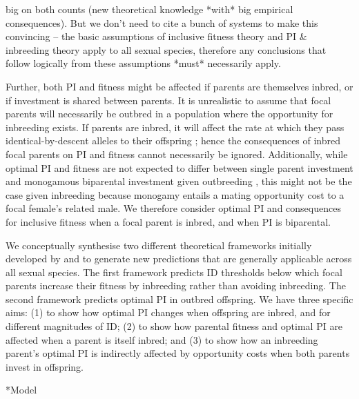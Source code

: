 \documentclass[12pt]{article}
\makeatletter
\renewcommand\section{\@startsection{section}{1}{0in}{-0.5\baselineskip}{0.1\baselineskip}{\normalfont\large\bfseries}}
\makeatother
\begin{document}
big on both counts (new theoretical knowledge *with* big empirical consequences). But we don't need to cite a bunch of systems to make this convincing -- the basic assumptions of inclusive fitness theory and PI & inbreeding theory apply to all sexual species, therefore any conclusions that follow logically from these assumptions *must* necessarily apply. 

Further, both PI and fitness might be affected if parents are themselves inbred, or if investment is shared between parents. It is unrealistic to assume that focal parents will necessarily be outbred in a population where the opportunity for inbreeding exists. If parents are inbred, it will affect the rate at which they pass identical-by-descent alleles to their offspring \cite[e.g.,][]{Duthie2015a}; hence the consequences of inbred focal parents on PI and fitness cannot necessarily be ignored. Additionally, while optimal PI and fitness are not expected to differ between single parent investment and monogamous biparental investment given outbreeding \cite[][]{Parker1985}, this might not be the case given inbreeding because monogamy entails a mating opportunity cost \cite[][]{Waser1986} to a focal female's related male. We therefore consider optimal PI and consequences for inclusive fitness when a focal parent is inbred, and when PI is biparental.

We conceptually synthesise two different theoretical frameworks initially developed by \cite{Parker1979} and \cite{Macnair1978} to generate new predictions that are generally applicable across all sexual species. The first framework \cite[][]{Parker1979} predicts ID thresholds below which focal parents increase their fitness by inbreeding rather than avoiding inbreeding. The second framework \cite[][]{Macnair1978} predicts optimal PI in outbred offspring. We have three specific aims: (1) to show how optimal PI changes when offspring are inbred, and for different magnitudes of ID; (2) to show how parental fitness and optimal PI are affected when a parent is itself inbred; and (3) to show how an inbreeding parent's optimal PI is indirectly affected by opportunity costs when both parents invest in offspring.


\section*{Model}
\end{document}
